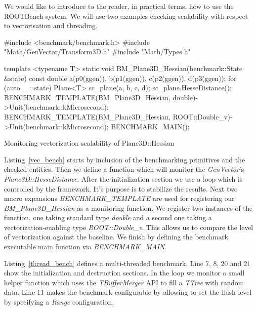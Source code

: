 \documentclass{webofc}
\begin{document}
\vspace{2em}

We would like to introduce to the reader, in practical terms, how to use the ROOTBench system. We will use two examples checking scalability with respect to vectorisation and threading.

\begin{listing}[h]
    \noindent
    \begin{minipage}[h]{.7\textwidth}
   \begin{cppcode*}{}
  #include <benchmark/benchmark.h>
  #include "Math/GenVector/Transform3D.h"
  #include "Math/Types.h"

  template <typename T>
  static void BM_Plane3D_Hessian(benchmark::State &state) {
     const double a(p0(ggen)), b(p1(ggen)), c(p2(ggen)), d(p3(ggen));
     for (auto _ : state) {
        Plane<T> sc_plane(a, b, c, d);
        sc_plane.HesseDistance();
     }
   }
   BENCHMARK_TEMPLATE(BM_Plane3D_Hessian, double)->Unit(benchmark::kMicrosecond);
   BENCHMARK_TEMPLATE(BM_Plane3D_Hessian, ROOT::Double_v)->Unit(benchmark::kMicrosecond);
   BENCHMARK_MAIN();
   \end{cppcode*}
   \end{minipage}
   \caption{Monitoring vectorization scalability of Plane3D::Hessian}
   \label{vec_bench}
\end{listing}

Listing~\ref{vec_bench} starts by inclusion of the benchmarking primitives and the checked entities. Then we define a function which will monitor the \textit{GenVector}'s \textit{Plane3D::HesseDistance}. After the initialization section we use a loop which is controlled by the framework. It's purpose is to stabilize the results. Next two macro expansions \textit{BENCHMARK\_TEMPLATE} are used for registering our \textit{BM\_Plane3D\_Hessian} as a monitoring function. We register two instances of the function, one taking standard type \textit{double} and a second one taking a vectorization-enabling type \textit{ROOT::Double\_v}. This allows us to compare the level of vectorization against the baseline. We finish by defining the benchmark executable main function via \textit{BENCHMARK\_MAIN}.

Listing~\ref{thread_bench} defines a multi-threaded benchmark. Line 7, 8, 20 and 21 show the initialization and destruction sections. In the loop we monitor a small helper function which uses the \textit{TBufferMerger} API to fill a \textit{TTree} with random data. Line 11 makes the benchmark configurable by allowing to set the flush level by specifying a \textit{Range} configuration.
\end{document}
